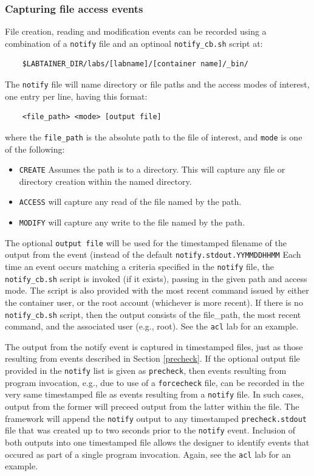 \documentclass[12pt]{article}
\begin{document}
\subsubsection{Capturing file access events}
\label{notify}
File creation, reading and modification events can be recorded using a combination of
a {\tt notify} file and an optinoal {\tt notify\_cb.sh} script at:
\begin{verbatim}
    $LABTAINER_DIR/labs/[labname]/[container name]/_bin/
\end{verbatim}
\noindent The {\tt notify} file will name directory or file paths and the access modes of interest, one entry
per line, having this format:
\begin{verbatim}
    <file_path> <mode> [output file]
\end{verbatim}
\noindent
where the {\tt file\_path} is the absolute path to the file of interest, and {\tt mode} is 
one of the following:
\begin{itemize}
\item {\tt CREATE} Assumes the path is to a directory.  This will capture any file or directory
creation within the named directory.
\item {\tt ACCESS} will capture any read of the file named by the path.
\item {\tt MODIFY} will capture any write to the file named by the path.
\end{itemize}
\noindent The optional {\tt output file} will be used for the timestamped filename of the
output from the event (instead of the default {\tt notify.stdout.YYMMDDHHMM}
\noindent Each time an event occurs matching a criteria specified in the {\tt notify} file,
the {\tt notify\_cb.sh} script is invoked (if it exists), passing in the given path and access mode.  
The script is also provided with the most recent command issued by either the container user, or the
root account (whichever is more recent).
If there is no {\tt notify\_cb.sh} script, then the output consists of the file\_path, the most recent
command, and the associated user (e.g., root).
See the {\tt acl} lab for an example.

The output from the notify event is captured in timestamped files, just as
those resulting from events described in Section \ref{precheck}.  If the optional output file
provided in the {\tt notify} list is given as {\tt precheck}, then
events resulting from program invocation, e.g., due to use of
a {\tt forcecheck} file, can be recorded in the very same timestamped file as events resulting
from a {\tt notify} file.  In such cases, output from the former will preceed output from the latter
within the file.  The framework will append the {\tt notify} output to any timestamped {\tt precheck.stdout}
file that was created up to two seconds prior to the {\tt notify} event.  Inclusion of both outputs into
one timestamped file allows the designer to identify events that occured as part of a single program
invocation.  Again, see the {\tt acl} lab for an example.
\end{document}
